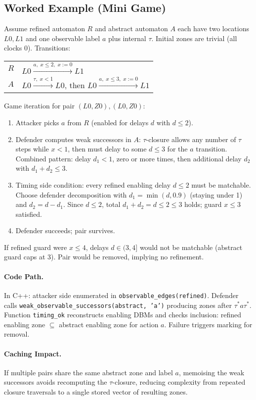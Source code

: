 \subsection{Worked Example (Mini Game)}
Assume refined automaton $R$ and abstract automaton $A$ each have two locations $L0, L1$ and one observable label $a$ plus internal $\tau$. Initial zones are trivial (all clocks 0). Transitions:
\begin{center}
\begin{tabular}{l|l}
$R$ & $L0 \xrightarrow{a,\; x\le 2,\; x:=0} L1$ \\
$A$ & $L0 \xrightarrow{\tau,\; x<1} L0$, then $L0 \xrightarrow{a,\; x\le 3,\; x:=0} L1$ \\
\end{tabular}
\end{center}

Game iteration for pair $(L0,Z0),(L0,Z0)$:
\begin{enumerate}
  \item Attacker picks $a$ from $R$ (enabled for delays $d$ with $d\le 2$).
  \item Defender computes weak successors in $A$: $\tau$-closure allows any number of $\tau$ steps while $x<1$, then must delay to some $d \le 3$ for the $a$ transition. Combined pattern: delay $d_1 < 1$, zero or more times, then additional delay $d_2$ with $d_1 + d_2 \le 3$.
  \item Timing side condition: every refined enabling delay $d \le 2$ must be matchable. Choose defender decomposition with $d_1 = \min(d, 0.9)$ (staying under 1) and $d_2 = d - d_1$. Since $d \le 2$, total $d_1+d_2 = d \le 2 \le 3$ holds; guard $x\le 3$ satisfied.
  \item Defender succeeds; pair survives.
\end{enumerate}

If refined guard were $x \le 4$, delays $d\in (3,4]$ would not be matchable (abstract guard caps at 3). Pair would be removed, implying no refinement.

\paragraph{Code Path.} In C++: attacker side enumerated in \texttt{observable\_edges(refined)}. Defender calls \texttt{weak\_observable\_successors(abstract, 'a')} producing zones after $\tau^* a \tau^*$. Function \texttt{timing\_ok} reconstructs enabling DBMs and checks inclusion: refined enabling zone $\subseteq$ abstract enabling zone for action $a$. Failure triggers marking for removal.

\paragraph{Caching Impact.} If multiple pairs share the same abstract zone and label $a$, memoising the weak successors avoids recomputing the $\tau$-closure, reducing complexity from repeated closure traversals to a single stored vector of resulting zones.
